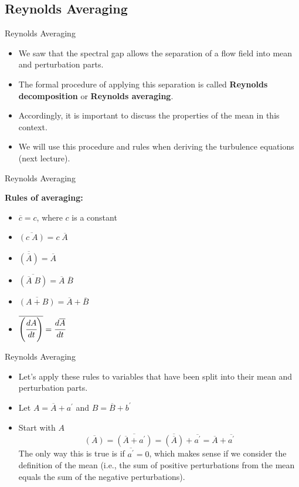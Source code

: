 \subsection{Reynolds Averaging}
\begin{frame}{Reynolds Averaging}

\begin{itemize}
	\item We saw that the spectral gap allows the separation of a flow field into mean and perturbation parts.
	\item The formal procedure of applying this separation is called \textbf{Reynolds decomposition} or \textbf{Reynolds averaging}.
	\item Accordingly, it is important to discuss the properties of the mean in this context.
	\item We will use this procedure and rules when deriving the turbulence equations (next lecture).
\end{itemize}
\end{frame}
\begin{frame}{Reynolds Averaging}

\textbf{Rules of averaging:}
\begin{itemize}
	\item $\overline{c} = c$, where $c$ is a constant
	\item $\overline{(c\; A)} = c\; \overline{A}$
	\item $\overline{(\overline{A})} = \overline{A}$
	\item $\overline{(\overline{A}\;B)} = \overline{A}\; \overline{B}$
	\item $\overline{(A+B)} = \overline{A} + \overline{B}$
	\item $\overline{\left(\cfrac{dA}{dt}\right)} = \cfrac{d\overline{A}}{dt}$
\end{itemize}
\end{frame}
\begin{frame}{Reynolds Averaging}

\begin{itemize}
	\item Let's apply these rules to variables that have been split into their mean and perturbation parts.
	\item Let $A = \overline{A} + a^\prime$ and $B = \overline{B} + b^\prime$
	\item Start with $A$
	$$\overline{(A)} = \overline{(\overline{A} + a^\prime)} = \overline{(\overline{A})} + \overline{a^\prime} = \overline{A} + \overline{a^\prime}$$
	The only way this is true is if $\overline{a^\prime} = 0$, which makes sense if we consider the definition of the mean (i.e., the sum of positive perturbations from the mean equals the sum of the negative perturbations).
\end{itemize}
\end{frame}
